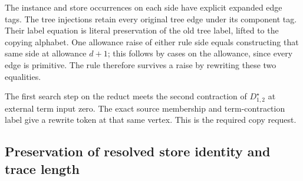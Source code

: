 





The instance and store occurrences on each side have explicit expanded
edge tags. The tree injections retain every original tree edge under its
component tag. Their label equation is literal preservation of the old tree
label, lifted to the copying alphabet. One allowance raise of either rule
side equals constructing that same side at allowance $d+1$; this follows by
cases on the allowance, since every edge is primitive. The rule therefore
survives a raise by rewriting these two equalities.

The first search step on the reduct meets the second contraction of
$D^{\star}_{1,2}$ at external term input zero. The exact source membership and
term-contraction label give a rewrite token at that same vertex. This is the
required copy request.












\subsection{Preservation of resolved store identity and trace length}

